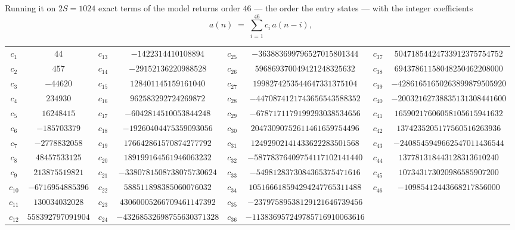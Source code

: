 \documentclass[11pt,a4paper]{article}
\theoremstyle{plain}
\theoremstyle{definition}
\begin{document}
Running it on $2S=1024$ exact terms of the model returns order $46$ --- the order the
entry states --- with the integer coefficients
\[
a(n)\;=\;\sum_{i=1}^{46}c_i\,a(n-i),
\]
\begin{center}\small
\begin{tabular}{cccccccc}
$c_{1}$ & $44$ & $c_{13}$ & $-1422314410108894$ & $c_{25}$ & $-363883699796527015801344$ & $c_{37}$ & $50471854424733912375754752$ \\
$c_{2}$ & $457$ & $c_{14}$ & $-29152136220988528$ & $c_{26}$ & $596869370049421248325632$ & $c_{38}$ & $69437861158048250462208000$ \\
$c_{3}$ & $-44620$ & $c_{15}$ & $128401145159161040$ & $c_{27}$ & $1998274253544647331375104$ & $c_{39}$ & $-42861651650263899879505920$ \\
$c_{4}$ & $234930$ & $c_{16}$ & $962583292724269872$ & $c_{28}$ & $-4470874121743656543588352$ & $c_{40}$ & $-20032162738835131308441600$ \\
$c_{5}$ & $16248415$ & $c_{17}$ & $-6042814510053844248$ & $c_{29}$ & $-6787171179199293038534656$ & $c_{41}$ & $16590217606058105615941632$ \\
$c_{6}$ & $-185703379$ & $c_{18}$ & $-19260404475359093056$ & $c_{30}$ & $20473090752611461659754496$ & $c_{42}$ & $1374235205177560516263936$ \\
$c_{7}$ & $-2778832058$ & $c_{19}$ & $176642861570874277792$ & $c_{31}$ & $12492902141433622283501568$ & $c_{43}$ & $-2408545949662547011436544$ \\
$c_{8}$ & $48457533125$ & $c_{20}$ & $189199164561946063232$ & $c_{32}$ & $-58778376409754117102141440$ & $c_{44}$ & $137781318443128313610240$ \\
$c_{9}$ & $213875519821$ & $c_{21}$ & $-3380781508738075730624$ & $c_{33}$ & $-5498128373084365375471616$ & $c_{45}$ & $107343173020986585907200$ \\
$c_{10}$ & $-6716954885396$ & $c_{22}$ & $588511898385060076032$ & $c_{34}$ & $105166618594294247765311488$ & $c_{46}$ & $-10985412443668217856000$ \\
$c_{11}$ & $130034032028$ & $c_{23}$ & $43060005266709461147392$ & $c_{35}$ & $-23797589538129121646739456$ &  &  \\
$c_{12}$ & $558392797091904$ & $c_{24}$ & $-43268532698755630371328$ & $c_{36}$ & $-113836957249785716910063616$ &  &  \\
\end{tabular}
\end{center}
\end{document}
